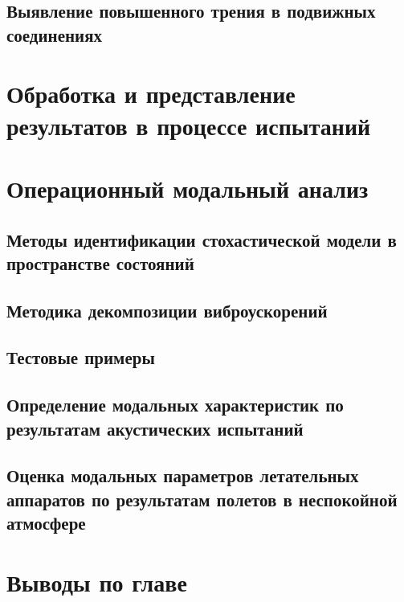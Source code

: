 \subsection{Выявление повышенного трения в подвижных соединениях}

\section{Обработка и представление результатов в процессе испытаний}


\section{Операционный модальный анализ}

\subsection{Методы идентификации стохастической модели в пространстве состояний}

\subsection{Методика декомпозиции виброускорений}

\subsection{Тестовые примеры}

\subsection{Определение модальных характеристик по результатам акустических испытаний}

\subsection{Оценка модальных параметров летательных аппаратов по результатам полетов в неспокойной атмосфере}

\section{Выводы по главе \thechapter}